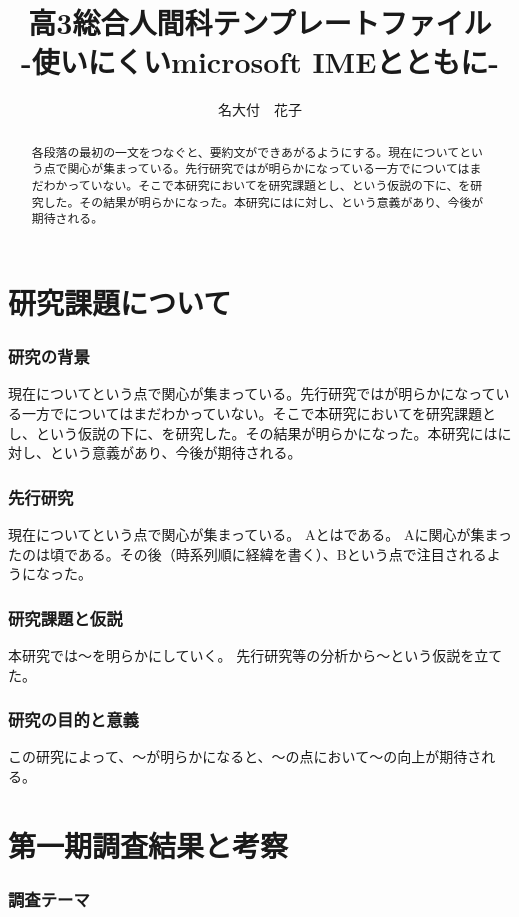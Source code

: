 \documentclass[twocolumn]{jsarticle}
\title{
高3総合人間科テンプレートファイル\\ \vspace{5pt}
{\fontsize{10pt}{0cm}\gt-使いにくいmicrosoft IMEとともに-}}
\author{名大付　花子}
\date{}
\begin{document}
\begin{abstract}
{\fontsize{9pt}{0cm}\mc
各段落の最初の一文をつなぐと、要約文ができあがるようにする。現在についてという点で関心が集まっている。先行研究ではが明らかになっている一方でについてはまだわかっていない。そこで本研究においてを研究課題とし、という仮説の下に、を研究した。その結果が明らかになった。本研究にはに対し、という意義があり、今後が期待される。
}\end{abstract}
\maketitle

\part{研究課題について}
\section{研究の背景}
現在についてという点で関心が集まっている。先行研究ではが明らかになっている一方でについてはまだわかっていない。そこで本研究においてを研究課題とし、という仮説の下に、を研究した。その結果が明らかになった。本研究にはに対し、という意義があり、今後が期待される。

\section{先行研究}
現在についてという点で関心が集まっている。
Aとはである。
Aに関心が集まったのは頃である。その後（時系列順に経緯を書く）、Bという点で注目されるようになった。



\section{研究課題と仮説}
本研究では〜を明らかにしていく。
先行研究等の分析から〜という仮説を立てた。

\section{研究の目的と意義}
この研究によって、〜が明らかになると、〜の点において〜の向上が期待される。


\part{第一期調査結果と考察}
\section{調査テーマ}
\end{document}
